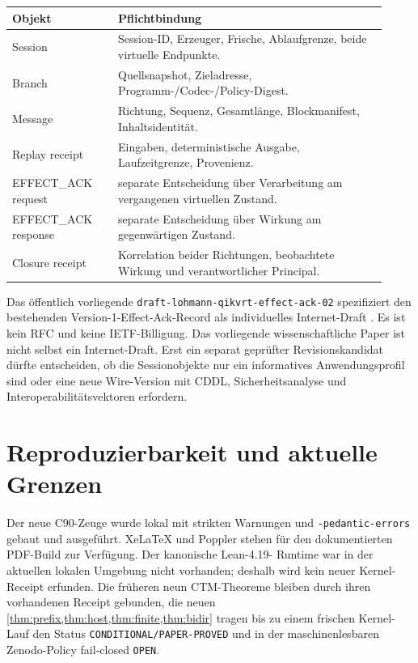 \documentclass[11pt,a4paper]{article}
\theoremstyle{remark}
\begin{document}
\begin{longtable}{@{}L{0.26\linewidth}L{0.66\linewidth}@{}}
\toprule
\textbf{Objekt} & \textbf{Pflichtbindung} \\
\midrule
\endhead
Session & Session-ID, Erzeuger, Frische, Ablaufgrenze, beide virtuelle
Endpunkte.\\
Branch & Quellsnapshot, Zieladresse, Programm-/Codec-/Policy-Digest.\\
Message & Richtung, Sequenz, Gesamtlänge, Blockmanifest, Inhaltsidentität.\\
Replay receipt & Eingaben, deterministische Ausgabe, Laufzeitgrenze,
Provenienz.\\
EFFECT\_ACK request & separate Entscheidung über Verarbeitung am
vergangenen virtuellen Zustand.\\
EFFECT\_ACK response & separate Entscheidung über Wirkung am gegenwärtigen
Zustand.\\
Closure receipt & Korrelation beider Richtungen, beobachtete Wirkung und
verantwortlicher Principal.\\
\bottomrule
\end{longtable}

Das öffentlich vorliegende
\texttt{draft-lohmann-qikvrt-effect-ack-02} spezifiziert den bestehenden
Version-1-Effect-Ack-Record als individuelles Internet-Draft
\cite{effectack}. Es ist kein RFC und keine IETF-Billigung. Das vorliegende
wissenschaftliche Paper ist nicht selbst ein Internet-Draft. Erst ein
separat geprüfter Revisionskandidat dürfte entscheiden, ob die Sessionobjekte
nur ein informatives Anwendungsprofil sind oder eine neue Wire-Version mit
CDDL, Sicherheitsanalyse und Interoperabilitätsvektoren erfordern.

\section{Reproduzierbarkeit und aktuelle Grenzen}

Der neue C90-Zeuge wurde lokal mit strikten Warnungen und
\texttt{-pedantic-errors} gebaut und ausgeführt. XeLaTeX und Poppler stehen
für den dokumentierten PDF-Build zur Verfügung. Der kanonische Lean-4.19-
Runtime war in der aktuellen lokalen Umgebung nicht vorhanden; deshalb wird
kein neuer Kernel-Receipt erfunden. Die früheren neun CTM-Theoreme bleiben
durch ihren vorhandenen Receipt gebunden, die neuen
\cref{thm:prefix,thm:host,thm:finite,thm:bidir} tragen bis zu einem frischen
Kernel-Lauf den Status \texttt{CONDITIONAL/PAPER-PROVED} und in der
maschinenlesbaren Zenodo-Policy fail-closed \texttt{OPEN}.
\end{document}
